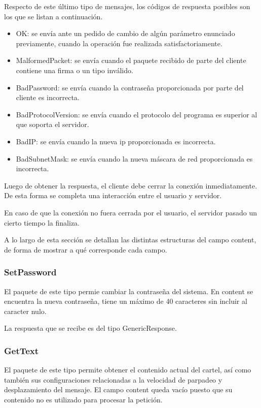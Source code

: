 Respecto de este último tipo de mensajes, los códigos de respuesta posibles son los que se listan a continuación.

\begin{itemize}
	\item OK: se envía ante un pedido de cambio de algún parámetro enunciado previamente, cuando la operación fue realizada satisfactoriamente.
	\item MalformedPacket: se envía cuando el paquete recibido de parte del cliente contiene una firma o un tipo inválido.
	\item BadPassword: se envía cuando la contraseña proporcionada por parte del cliente es incorrecta.
	\item BadProtocolVersion: se envía cuando el protocolo del programa es superior al que soporta el servidor.
	\item BadIP: se envía cuando la nueva ip proporcionada es incorrecta.
	\item BadSubnetMask: se envía cuando la nueva máscara de red proporcionada es incorrecta.
\end{itemize}

Luego de obtener la respuesta, el cliente debe cerrar la conexión inmediatamente.
De esta forma se completa una interacción entre el usuario y servidor.

En caso de que la conexión no fuera cerrada por el usuario, el servidor pasado un cierto tiempo la finaliza.

A lo largo de esta sección se detallan las distintas estructuras del campo content, de forma de mostrar a qué corresponde cada campo.



\subsubsection{SetPassword}

El paquete de este tipo permie cambiar la contraseña del sistema.
En content se encuentra la nueva contraseña, tiene un máximo de 40 caracteres sin incluir al caracter nulo.

La respuesta que se recibe es del tipo GenericResponse.



\subsubsection{GetText}

El paquete de este tipo permite obtener el contenido actual del cartel, así como también sus configuraciones relacionadas a la velocidad de parpadeo y desplazamiento del mensaje.
El campo content queda vacío puesto que su contenido no es utilizado para procesar la petición.

